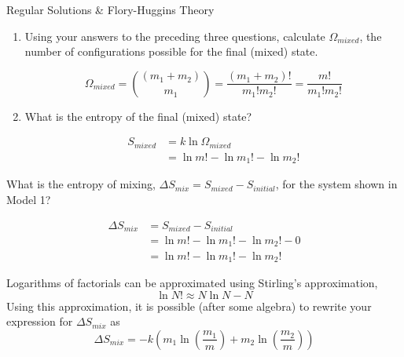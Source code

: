 \begin{activity}{Regular Solutions \& Flory-Huggins Theory}
\begin{ctqs}
\begin{enumerate}
				\item Using your answers to the preceding three questions, calculate $\Omega_{mixed}$, the number of configurations possible for the final (mixed) state.
				
					\begin{solution}[1in]
						\begin{equation*}
							\Omega_{mixed} = {(m_1+m_2) \choose m_1} = \frac{(m_1+m_2)!}{m_1! m_2!} = \frac{m!}{m_1! m_2!}
						\end{equation*}
					\end{solution}
					
				\item What is the entropy of the final (mixed) state?
				
					\begin{solution}[1in]
						\begin{align*}
							S_{mixed} &= k \ln \Omega_{mixed}\\
							&= \ln m! - \ln m_1! - \ln m_2!
						\end{align*}
					\end{solution}
				
				
			\end{enumerate}
		\question What is the entropy of mixing, $\Delta S_{mix} = S_{mixed} - S_{initial}$, for the system shown in Model 1?
				
					\begin{solution}[1in]
						\begin{align*}
							\Delta S_{mix} &= S_{mixed} - S_{initial}\\
							 &= \ln m! - \ln m_1! - \ln m_2! - 0 \\
							 &= \ln m! - \ln m_1! - \ln m_2!
						\end{align*}
					\end{solution}
\end{ctqs}

\begin{infobox}
	Logarithms of factorials can be approximated using Stirling's approximation,
	\begin{equation*}
		\ln N! \approx N \ln N - N \label{eqn:stirling}
	\end{equation*}
	Using this approximation, it is possible (after some algebra) to rewrite your expression for $\Delta S_{mix}$ as
	\begin{equation*}
		\Delta S_{mix} = -k\left(m_1 \ln\left(\frac{m_1}{m}\right) + m_2 \ln\left(\frac{m_2}{m}\right) \right)
	\end{equation*}
\end{infobox}


\end{activity}
